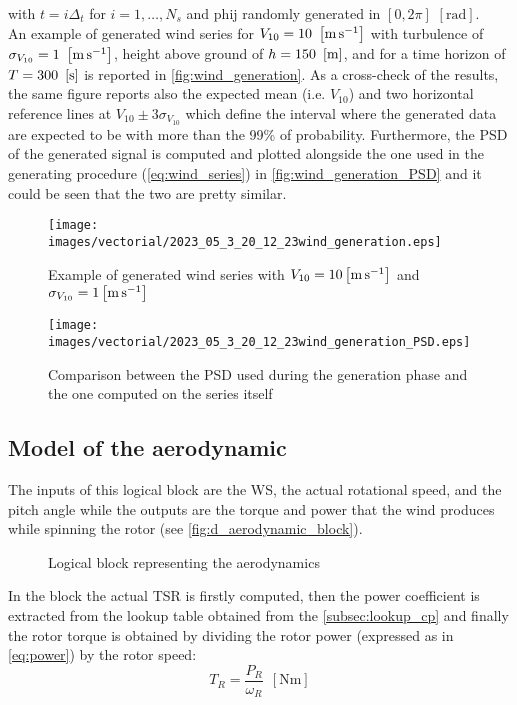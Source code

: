 with $t = i\Delta_t$ for $i=1,\dots,N_s$ and \acrshort{phij} randomly generated in $ \left[0, 2\pi\right]$ $\left[\si{\radian}\right]$. \\
An example of generated wind series for $V_{10}=10 \ \left[\si{\meter\per\second}\right]$ with turbulence of $\sigma_{V_{10}}=1 \ \mesunt{\meter\per\second}$, height above ground of $h=150 
 \ \left[\si{\meter}\right]$, and for a time horizon of $T = 300 \ \left[\si{\second}\right]$ is reported in \autoref{fig:wind_generation}. As a cross-check of the results, the same figure reports also the expected mean (i.e. $V_{10}$) and two horizontal reference lines at $V_{10}\pm3\sigma_{V_{10}}$ which define the interval where the generated data are expected to be with more than the 99\% of probability. Furthermore, the PSD of the generated signal is computed and plotted alongside the one used in the generating procedure (\autoref{eq:wind_series}) in \autoref{fig:wind_generation_PSD} and it could be seen that the two are pretty similar. 
\begin{figure}[htb]
    \centering
    \texttt{[image: images/vectorial/2023\_05\_3\_20\_12\_23wind\_generation.eps]}
    \caption{Example of generated wind series with $V_{10}=10\left[\si{\meter\per\second}\right]$ and $\sigma_{V_{10}}=1\left[\si{\meter\per\second}\right]$ }
    \label{fig:wind_generation}
\end{figure}

\begin{figure}[htb]
    \centering
    \texttt{[image: images/vectorial/2023\_05\_3\_20\_12\_23wind\_generation\_PSD.eps]}
    \caption{Comparison between the PSD used during the generation phase and the one computed on the series itself}
    \label{fig:wind_generation_PSD}
\end{figure}

\subsection[Aerodynamic]{Model of the aerodynamic}
The inputs of this logical block are the WS, the actual rotational speed, and the pitch angle while the outputs are the torque and power that the wind produces while spinning the rotor (see \autoref{fig:d_aerodynamic_block}). 
\begin{figure}
  \centering
  
  \caption{Logical block representing the aerodynamics}
  \label{fig:d_aerodynamic_block}
\end{figure}

In the block the actual \acrshort{TSR} is firstly computed, then the power coefficient is extracted from the lookup table obtained from the \autoref{subsec:lookup_cp} and finally the rotor torque is obtained by dividing the rotor power (expressed as in \autoref{eq:power}) by the rotor speed:
\begin{equation}
    T_R = \frac{P_R}{\omega_R} \ \ \left[\si{\newton\meter}\right]
\end{equation}

